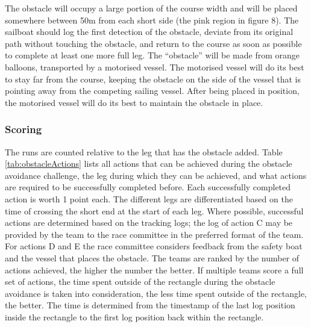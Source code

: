 \documentclass[12pt]{article}
\begin{document}
The obstacle will occupy a large portion of the course width and will be placed
somewhere between 50m from each short side (the pink region in figure 8). 
The sailboat should log the first detection of the obstacle, deviate from its
original path without touching the obstacle, and return to the course as soon 
as possible to complete at least one more full leg. 
The “obstacle” will be made from orange balloons, transported by a motorised
vessel. The motorised vessel will do its best to stay far from the course,
keeping the obstacle on the side of the vessel that is pointing away from the
competing sailing vessel. After being placed in
position, the motorised vessel will do its best to maintain the obstacle in place.

\subsubsection{Scoring}

The runs are counted relative to the leg that has the obstacle added. Table
\ref{tab:obstacleActions} lists all actions that can be achieved during the
obstacle avoidance challenge, the leg during which they can be achieved, and
what actions are required to be successfully completed before.
Each successfully completed action is worth 1 point each. The different legs are
differentiated based on the time of crossing the short end at the start of each leg.
Where possible, successful actions are determined based on the tracking logs;
the log of action C may be provided by the team to the race committee in the
preferred format of the team. For actions D and E the race committee considers 
feedback from the safety boat
and the vessel that places the obstacle.
The teams are ranked by the number of actions achieved, the higher the number
the better. If multiple teams score a full set of actions, the time spent outside of the
rectangle during the obstacle avoidance is taken into consideration, the less
time spent outside of the rectangle, the better. The time is determined from the
timestamp of the last log position inside the rectangle to the first log position 
back within the rectangle.
\end{document}
